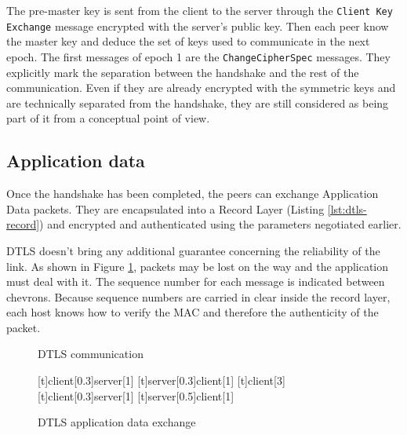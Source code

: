 The pre-master key is sent from the client to the server through the \texttt{Client Key Exchange} message encrypted with the server's public key. Then each peer know the master key and deduce the set of keys used to communicate in the next epoch. The first messages of epoch 1 are the \texttt{ChangeCipherSpec} messages. They explicitly mark the separation between the handshake and the rest of the communication. Even if they are already encrypted with the symmetric keys and are technically separated from the handshake, they are still considered as being part of it from a conceptual point of view.


\subsection{Application data}

Once the handshake has been completed, the peers can exchange Application Data packets. They are encapsulated into a Record Layer (Listing \ref{lst:dtls-record}) and encrypted and authenticated using the parameters negotiated earlier. 

DTLS doesn't bring any additional guarantee concerning the reliability of the link. As shown in Figure \ref{fig:dtls-data}, packets may be lost on the way and the application must deal with it. The sequence number for each message is indicated between chevrons. Because sequence numbers are carried in clear inside the record layer, each host knows how to verify the MAC and therefore the authenticity of the packet.

\begin{figure}[!h]
\centering
\begin{msc}[r]{DTLS communication}

\setlength{\instfootheight}{0em}
\setlength{\instheadheight}{0em}
\setlength{\instdist}{0.7\linewidth}
\setlength{\levelheight}{3em}


[t]{client}[0.3]{server}[1]
\nextlevel
{}[t]{server}[0.3]{client}[1]
\nextlevel
\nextlevel
{}[t]{}{client}[3]
\nextlevel
{}[t]{client}[0.3]{server}[1]
\nextlevel
{}[t]{server}[0.5]{client}[1]
\nextlevel
\nextlevel
\end{msc}
\caption{DTLS application data exchange}
\label{fig:dtls-data}
\end{figure}

